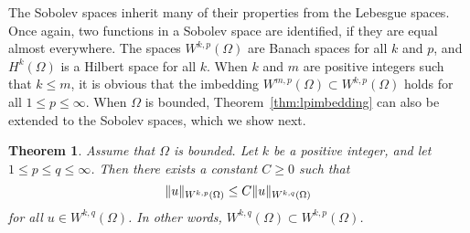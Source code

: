 \documentclass[english, 12pt, a4paper, sci, utf8, a-2b, online]{aaltothesis}
\theoremstyle{definition}
\theoremstyle{plain}
\newtheorem{theorem}{Theorem}[section]
\DeclarePairedDelimiter\norm{\lVert}{\rVert}
\numberwithin{equation}{section}
\begin{document}
The Sobolev spaces inherit many of their properties from the Lebesgue spaces.
Once again, two functions in a Sobolev space are identified,
if they are equal almost everywhere.
The spaces $W^{k,p}(\Omega)$ are Banach spaces for all $k$ and $p$,
and $H^k(\Omega)$ is a Hilbert space for all $k$.
When $k$ and $m$ are positive integers such that $k \leq m$,
it is obvious that the imbedding
$W^{m,p}(\Omega) \subset W^{k,p}(\Omega)$ holds for all $1 \leq p \leq \infty$.
When $\Omega$ is bounded, Theorem~\ref{thm:lpimbedding} can also be extended
to the Sobolev spaces, which we show next.
\begin{theorem}
    \label{thm:sobolevlpimbedding}
    Assume that $\Omega$ is bounded. Let $k$ be a positive integer, and let
    $1 \leq p \leq q \leq \infty$. Then there exists a constant $C \geq 0$
    such that
    \begin{equation*}
        \norm{u}_{W^{k,p}(\Omega)} \leq C \norm{u}_{W^{k,q}(\Omega)}
    \end{equation*}
    for all $u \in W^{k,q}(\Omega)$. In other words,
    $W^{k,q}(\Omega) \subset W^{k,p}(\Omega)$.
\end{theorem}
\end{document}
